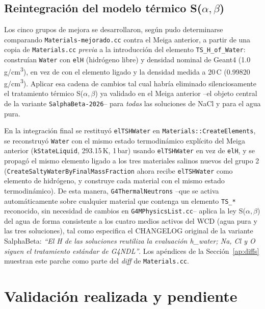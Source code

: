 \documentclass[11pt,a4paper]{article}
\newcommand{\codigo}[1]{\nolinkurl{#1}}
\begin{document}
\subsection{Reintegración del modelo térmico S($\alpha,\beta$)}
\label{sec:salphabeta}

Los cinco grupos de mejora se desarrollaron, según pudo determinarse
comparando \codigo{Materials-mejorado.cc} contra el Meiga anterior, a
partir de una copia de \codigo{Materials.cc} \emph{previa} a la
introducción del elemento \codigo{TS\_H\_of\_Water}: construían
\codigo{Water} con \codigo{elH} (hidrógeno libre) y densidad nominal de
Geant4 (1.0\,g/cm\textsuperscript{3}), en vez de con el elemento ligado y
la densidad medida a 20\,\textdegree C (0.99820\,g/cm\textsuperscript{3}).
Aplicar esa cadena de cambios tal cual habría eliminado silenciosamente el
tratamiento térmico S($\alpha,\beta$) ya validado en el Meiga anterior
--el objeto central de la variante \codigo{SalphaBeta-2026}-- para
\emph{todas} las soluciones de NaCl y para el agua pura.

En la integración final se restituyó \codigo{elTSHWater} en
\codigo{Materials::CreateElements}, se reconstruyó \codigo{Water} con el
mismo estado termodinámico explícito del Meiga anterior
(\codigo{kStateLiquid}, 293.15\,K, 1\,bar) usando \codigo{elTSHWater} en
vez de \codigo{elH}, y se propagó el mismo elemento ligado a los tres
materiales salinos nuevos del grupo 2
(\codigo{CreateSaltyWaterByFinalMassFraction} ahora recibe
\codigo{elTSHWater} como elemento de hidrógeno, y construye cada material
con el mismo estado termodinámico). De esta manera, \codigo{G4ThermalNeutrons}
--que se activa automáticamente sobre cualquier material que contenga un
elemento \codigo{TS\_*} reconocido, sin necesidad de cambios en
\codigo{G4MPhysicsList.cc}-- aplica la ley S($\alpha,\beta$) del agua de
forma consistente a los cuatro medios activos del WCD (agua pura y las
tres soluciones), tal como especifica el CHANGELOG original de la
variante SalphaBeta: \emph{“El H de las soluciones reutiliza la evaluación
h\_water; Na, Cl y O siguen el tratamiento estándar de G4NDL”}. Los
apéndices de la Sección~\ref{ap:diffs} muestran este parche como parte
del \emph{diff} de \codigo{Materials.cc}.

\section{Validación realizada y pendiente}
\label{sec:validacion}
\end{document}
